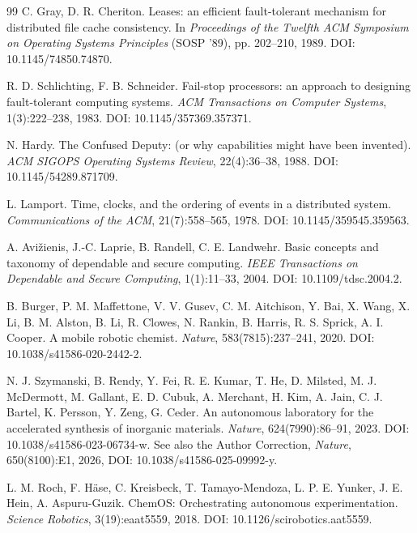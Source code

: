 \documentclass[11pt]{article}
\begin{document}
\begin{thebibliography}{99}
 C. Gray, D. R. Cheriton. Leases: an efficient fault-tolerant mechanism
for distributed file cache consistency. In \emph{Proceedings of the Twelfth ACM Symposium on
Operating Systems Principles} (SOSP '89), pp. 202--210, 1989. DOI: 10.1145/74850.74870.

 R. D. Schlichting, F. B. Schneider. Fail-stop processors: an
approach to designing fault-tolerant computing systems. \emph{ACM Transactions on Computer
Systems}, 1(3):222--238, 1983. DOI: 10.1145/357369.357371.

 N. Hardy. The Confused Deputy: (or why capabilities might have been
invented). \emph{ACM SIGOPS Operating Systems Review}, 22(4):36--38, 1988.
DOI: 10.1145/54289.871709.

 L. Lamport. Time, clocks, and the ordering of events in a distributed
system. \emph{Communications of the ACM}, 21(7):558--565, 1978. DOI: 10.1145/359545.359563.

 A. Avi\v{z}ienis, J.-C. Laprie, B. Randell, C. E. Landwehr. Basic
concepts and taxonomy of dependable and secure computing. \emph{IEEE Transactions on
Dependable and Secure Computing}, 1(1):11--33, 2004. DOI: 10.1109/tdsc.2004.2.

 B. Burger, P. M. Maffettone, V. V. Gusev, C. M. Aitchison, Y. Bai,
X. Wang, X. Li, B. M. Alston, B. Li, R. Clowes, N. Rankin, B. Harris, R. S. Sprick,
A. I. Cooper. A mobile robotic chemist. \emph{Nature}, 583(7815):237--241, 2020.
DOI: 10.1038/s41586-020-2442-2.

 N. J. Szymanski, B. Rendy, Y. Fei, R. E. Kumar, T. He, D. Milsted,
M. J. McDermott, M. Gallant, E. D. Cubuk, A. Merchant, H. Kim, A. Jain, C. J. Bartel,
K. Persson, Y. Zeng, G. Ceder. An autonomous laboratory for the accelerated synthesis of
inorganic materials. \emph{Nature}, 624(7990):86--91, 2023.
DOI: 10.1038/s41586-023-06734-w. See also the Author Correction, \emph{Nature},
650(8100):E1, 2026, DOI: 10.1038/s41586-025-09992-y.

 L. M. Roch, F. H\"ase, C. Kreisbeck, T. Tamayo-Mendoza, L. P. E. Yunker,
J. E. Hein, A. Aspuru-Guzik. ChemOS: Orchestrating autonomous experimentation.
\emph{Science Robotics}, 3(19):eaat5559, 2018. DOI: 10.1126/scirobotics.aat5559.


\end{thebibliography}
\end{document}
